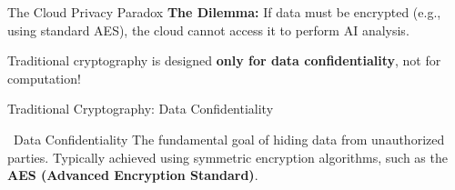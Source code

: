 \documentclass[aspectratio=169, 10pt]{beamer}
\begin{document}
\begin{frame}{The Cloud Privacy Paradox}
    \textbf{The Dilemma:} If data must be encrypted (e.g., using standard AES), the cloud cannot access it to perform AI analysis.
    
    \vspace{0.8cm}
    \centering
    
    \vspace{0.8cm}
    Traditional cryptography is designed \textbf{only for data confidentiality}, not for computation!
\end{frame}

\begin{frame}{Traditional Cryptography: Data Confidentiality}
    \begin{block}{\faLock \ Data Confidentiality}
        The fundamental goal of hiding data from unauthorized parties. Typically achieved using symmetric encryption algorithms, such as the \textbf{AES (Advanced Encryption Standard)}.
    \end{block}
\end{frame}
\end{document}
